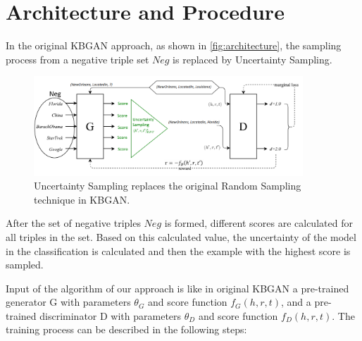 
\section{Architecture and Procedure} 
\label{sec:architecture_and_procedure}




In the original \ac{KBGAN} approach, as shown in \autoref{fig:architecture}, the sampling process from a negative triple set $Neg$ is replaced by Uncertainty Sampling.
\begin{figure}[t]
  \centering
    \includegraphics[width=0.90\textwidth]{figures/architecture.png}
  \caption{Uncertainty Sampling replaces the original Random Sampling technique in \ac{KBGAN}.}
  \label{fig:architecture}
\end{figure}
After the set of negative triples $Neg$ is formed, different scores are calculated for all triples in the set.
Based on this calculated value, the uncertainty of the model in the classification is calculated and then the example with the highest score is sampled. 

Input of the algorithm of our approach is like in original \ac{KBGAN} a pre-trained generator G with parameters $\theta_G$ and score function $f_G(h,r,t)$, 
and a pre-trained discriminator D with parameters $\theta_D$ and score function $f_D(h,r,t)$.
The training process can be described in the following steps:

